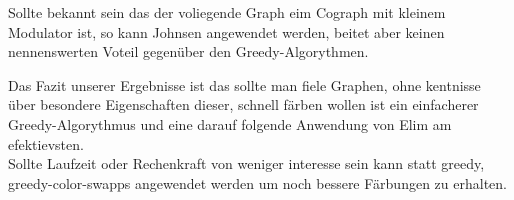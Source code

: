 \documentclass[11pt]{article}
\begin{document}
Sollte bekannt sein das der voliegende Graph eim Cograph mit kleinem Modulator ist, so kann Johnsen angewendet werden, beitet aber keinen nennenswerten Voteil gegenüber den Greedy-Algorythmen.

Das Fazit unserer Ergebnisse ist das sollte man fiele Graphen, ohne kentnisse über besondere Eigenschaften dieser, schnell färben wollen ist ein einfacherer Greedy-Algorythmus und eine darauf folgende Anwendung von Elim am efektievsten. \\
Sollte Laufzeit oder Rechenkraft von weniger interesse sein kann statt greedy, greedy-color-swapps angewendet werden um noch bessere Färbungen zu erhalten.



\end{document}
